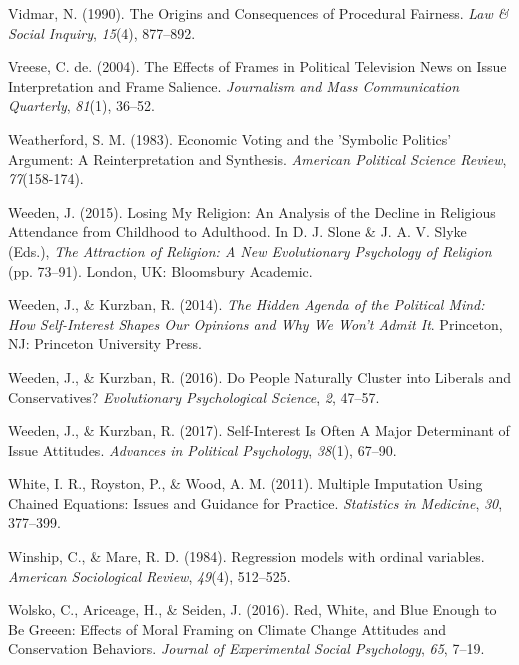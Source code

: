\documentclass[12pt,econ]{sources/authesis}
\begin{document}
\leavevmode\hypertarget{ref-vidmar_1990_origins}{}%
Vidmar, N. (1990). The Origins and Consequences of Procedural Fairness. \emph{Law \& Social Inquiry}, \emph{15}(4), 877--892.

\leavevmode\hypertarget{ref-vreese_effects_2004}{}%
Vreese, C. de. (2004). The Effects of Frames in Political Television News on Issue Interpretation and Frame Salience. \emph{Journalism and Mass Communication Quarterly}, \emph{81}(1), 36--52.

\leavevmode\hypertarget{ref-weatherford_economic_1983}{}%
Weatherford, S. M. (1983). Economic Voting and the 'Symbolic Politics' Argument: A Reinterpretation and Synthesis. \emph{American Political Science Review}, \emph{77}(158-174).

\leavevmode\hypertarget{ref-weeden_2015_losing}{}%
Weeden, J. (2015). Losing My Religion: An Analysis of the Decline in Religious Attendance from Childhood to Adulthood. In D. J. Slone \& J. A. V. Slyke (Eds.), \emph{The Attraction of Religion: A New Evolutionary Psychology of Religion} (pp. 73--91). London, UK: Bloomsbury Academic.

\leavevmode\hypertarget{ref-weeden_2014_hidden}{}%
Weeden, J., \& Kurzban, R. (2014). \emph{The Hidden Agenda of the Political Mind: How Self-Interest Shapes Our Opinions and Why We Won't Admit It}. Princeton, NJ: Princeton University Press.

\leavevmode\hypertarget{ref-weeden_2016_people}{}%
Weeden, J., \& Kurzban, R. (2016). Do People Naturally Cluster into Liberals and Conservatives? \emph{Evolutionary Psychological Science}, \emph{2}, 47--57.

\leavevmode\hypertarget{ref-weeden_2017_self-interest}{}%
Weeden, J., \& Kurzban, R. (2017). Self-Interest Is Often A Major Determinant of Issue Attitudes. \emph{Advances in Political Psychology}, \emph{38}(1), 67--90.

\leavevmode\hypertarget{ref-white_2011_multiple}{}%
White, I. R., Royston, P., \& Wood, A. M. (2011). Multiple Imputation Using Chained Equations: Issues and Guidance for Practice. \emph{Statistics in Medicine}, \emph{30}, 377--399.

\leavevmode\hypertarget{ref-winship_1984_regression}{}%
Winship, C., \& Mare, R. D. (1984). Regression models with ordinal variables. \emph{American Sociological Review}, \emph{49}(4), 512--525.

\leavevmode\hypertarget{ref-wolsko_2016_white}{}%
Wolsko, C., Ariceage, H., \& Seiden, J. (2016). Red, White, and Blue Enough to Be Greeen: Effects of Moral Framing on Climate Change Attitudes and Conservation Behaviors. \emph{Journal of Experimental Social Psychology}, \emph{65}, 7--19.
\end{document}
